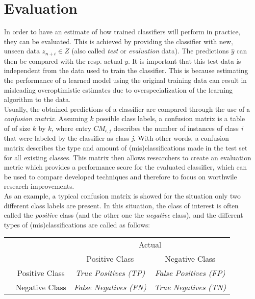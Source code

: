 \newpage
\section{Evaluation}\label{classification-evaluation}
In order to have an estimate of how trained classifiers will perform in practice, they can be evaluated. This is achieved by providing the classifier with new, unseen data \(z_{n+i} \in Z\) (also called \textit{test} or \textit{evaluation} data). The predictions \(\widehat{y}\) can then be compared with the resp. actual \(y\).  It is important that this test data is independent from the data used to train the classifier.  This is because estimating the performance of a learned model using the original training data can result in misleading overoptimistic estimates due to overspecialization of the learning algorithm to the data.\\
Usually, the obtained predictions of a classifier are compared through the use of a \textit{confusion matrix}.  Assuming \(k\) possible class labels, a confusion matrix is a table of of size \(k\) by \(k\), where entry \(CM_{i,j}\) describes the number of instances of class \textit{i} that were labeled by the classifier as class \textit{j}. With other words, a confusion matrix describes the type and amount of (mis)classifications made in the test set for all existing classes. This matrix then allows researchers to create an evaluation metric which provides a performance score for the evaluated classifier, which can be used to compare developed techniques and therefore to focus on worthwile research improvements.\\
As an example, a typical confusion matrix is showed for the situation only two different class labels are present. In this situation, the class of interest is often called the \textit{positive} class (and the other one the \textit{negative} class), and the different types of (mis)classifications are called as follows:\\

\begin{table}[h]
\centering                          
\begin{tabular}{l c | c c}            
& & \multicolumn{2}{c}{Actual} \\
& & Positive Class & Negative Class \\ [0.5ex]  
\hline     
& Positive Class & \textit{True Positives (TP)} & \textit{False Positives (FP)} \\[-1ex]
\raisebox{1.5ex}{Predicted} &Negative Class  &\textit{False Negatives (FN)} & \textit{True Negatives (TN)}\\[1ex] 
\hline
\end{tabular}
\label{tab:PPer}
\end{table}

